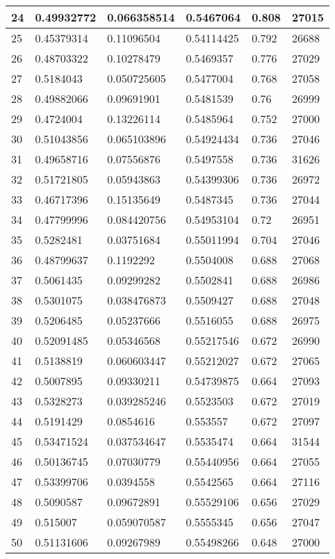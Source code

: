 \begin{longtable}{|l|l|l|l|l|l|}
24 & 0.49932772 & 0.066358514 & 0.5467064 & 0.808 & 27015 \\ \hline 
25 & 0.45379314 & 0.11096504 & 0.54114425 & 0.792 & 26688 \\ \hline 
26 & 0.48703322 & 0.10278479 & 0.5469357 & 0.776 & 27029 \\ \hline 
27 & 0.5184043 & 0.050725605 & 0.5477004 & 0.768 & 27058 \\ \hline 
28 & 0.49882066 & 0.09691901 & 0.5481539 & 0.76 & 26999 \\ \hline 
29 & 0.4724004 & 0.13226114 & 0.5485964 & 0.752 & 27000 \\ \hline 
30 & 0.51043856 & 0.065103896 & 0.54924434 & 0.736 & 27046 \\ \hline 
31 & 0.49658716 & 0.07556876 & 0.5497558 & 0.736 & 31626 \\ \hline 
32 & 0.51721805 & 0.05943863 & 0.54399306 & 0.736 & 26972 \\ \hline 
33 & 0.46717396 & 0.15135649 & 0.5487345 & 0.736 & 27044 \\ \hline 
34 & 0.47799996 & 0.084420756 & 0.54953104 & 0.72 & 26951 \\ \hline 
35 & 0.5282481 & 0.03751684 & 0.55011994 & 0.704 & 27046 \\ \hline 
36 & 0.48799637 & 0.1192292 & 0.5504008 & 0.688 & 27068 \\ \hline 
37 & 0.5061435 & 0.09299282 & 0.5502841 & 0.688 & 26986 \\ \hline 
38 & 0.5301075 & 0.038476873 & 0.5509427 & 0.688 & 27048 \\ \hline 
39 & 0.5206485 & 0.05237666 & 0.5516055 & 0.688 & 26975 \\ \hline 
40 & 0.52091485 & 0.05346568 & 0.55217546 & 0.672 & 26990 \\ \hline 
41 & 0.5138819 & 0.060603447 & 0.55212027 & 0.672 & 27065 \\ \hline 
42 & 0.5007895 & 0.09330211 & 0.54739875 & 0.664 & 27093 \\ \hline 
43 & 0.5328273 & 0.039285246 & 0.5523503 & 0.672 & 27019 \\ \hline 
44 & 0.5191429 & 0.0854616 & 0.553557 & 0.672 & 27097 \\ \hline 
45 & 0.53471524 & 0.037534647 & 0.5535474 & 0.664 & 31544 \\ \hline 
46 & 0.50136745 & 0.07030779 & 0.55440956 & 0.664 & 27055 \\ \hline 
47 & 0.53399706 & 0.0394558 & 0.5542565 & 0.664 & 27116 \\ \hline 
48 & 0.5090587 & 0.09672891 & 0.55529106 & 0.656 & 27029 \\ \hline 
49 & 0.515007 & 0.059070587 & 0.5555345 & 0.656 & 27047 \\ \hline 
50 & 0.51131606 & 0.09267989 & 0.55498266 & 0.648 & 27000 \\ \hline 
\end{longtable}
